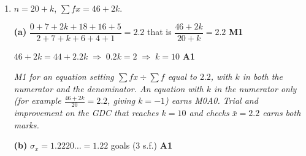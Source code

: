 \documentclass[12pt, twoside]{article}
\begin{document}
\begin{enumerate}[itemsep=0.3cm]
\textbf{(d)} $\sigma_{F} = 1.8 \times \sigma_{x} = 1.8 \times 2.4494\ldots$
\hfill \textbf{(M1)}

$= 4.4090\ldots = 4.41\,^{\circ}$F (3 s.f.) \hfill \textbf{A1}

\emph{Accept $1.8\sqrt{6}$, or $1.8 \times 2.45 = 4.41$. Recomputing from the
ten converted values earns both marks. \textbf{The common error:}
$1.8 \times 2.45 + 32 = 36.4$ --- adding $32$ to the standard deviation earns
M0A0. FT from the candidate's standard deviation in (a); from $s_{x}$ the FT
answer is $4.65$.}

\textbf{(e)} Adding $32$ moves every temperature, and so the mean, up by
$32$. \hfill \textbf{R1}

The distance of each temperature from the mean is unchanged, so the spread
of the data, and therefore the standard deviation, is unchanged.
\hfill \textbf{R1}

\emph{First R1 for the shift of every value (and so the mean). Second R1 for
the reason the standard deviation is unaffected: distances from the mean,
gaps between values, or the spread, stay the same. ``Adding does not affect
the standard deviation'' restates the claim and earns R0 for the second mark.
Accept a reason that names the multiplier: ``only the $\times 1.8$ stretches
the data, the $+32$ only slides it''.}

\newpage

\item[2.] [Maximum mark: 7]

$n = 20 + k$, \quad $\sum fx = 46 + 2k$.

\textbf{(a)} $\dfrac{0 + 7 + 2k + 18 + 16 + 5}{2 + 7 + k + 6 + 4 + 1}
= 2.2$ \quad that is \quad $\dfrac{46 + 2k}{20 + k} = 2.2$
\hfill \textbf{M1}

$46 + 2k = 44 + 2.2k \;\Rightarrow\; 0.2k = 2 \;\Rightarrow\; k = 10$
\hfill \textbf{A1}

\emph{M1 for an equation setting $\sum fx \div \sum f$ equal to $2.2$, with
$k$ in both the numerator and the denominator. An equation with $k$ in the
numerator only (for example $\frac{46 + 2k}{20} = 2.2$, giving $k = -1$)
earns M0A0. Trial and improvement on the GDC that reaches $k = 10$ and checks
$\bar{x} = 2.2$ earns both marks.}

\textbf{(b)} $\sigma_{x} = 1.2220\ldots = 1.22$ goals (3 s.f.)
\hfill \textbf{A1}


\end{enumerate}
\end{document}
